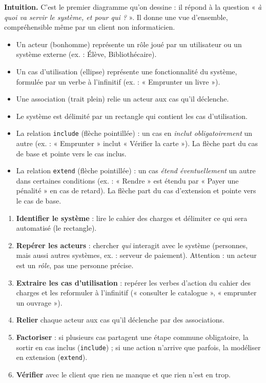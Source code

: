 \documentclass[11pt]{article}
\newcommand{\cle}[1]{{\popxbold\color{popdark}#1}}
\newcounter{popsec}
\newcounter{popsub}
\newcommand{\courssub}[1]{%
  \stepcounter{popsub}%
  \par\vspace{9pt}\noindent{\popxbold\fontsize{11.5}{13}\selectfont\color{popink}{\color{poporange}\thepopsec.\thepopsub}\hspace{6pt}#1}\par\nopagebreak\vspace{4pt}
}
\begin{document}
\courssub{Le diagramme de cas d'utilisation}

\textbf{Intuition.} C'est le premier diagramme qu'on dessine : il répond à la question « \emph{à quoi va servir le système, et pour qui ?} ». Il donne une vue d'ensemble, compréhensible même par un client non informaticien.

\begin{definition}
\begin{itemize}
\item Un \cle{acteur} (bonhomme) représente un rôle joué par un utilisateur ou un système externe (ex. : Élève, Bibliothécaire).
\item Un \cle{cas d'utilisation} (ellipse) représente une fonctionnalité du système, formulée par un verbe à l'infinitif (ex. : « Emprunter un livre »).
\item Une \cle{association} (trait plein) relie un acteur aux cas qu'il déclenche.
\item Le \cle{système} est délimité par un rectangle qui contient les cas d'utilisation.
\item La relation \texttt{include} (flèche pointillée) : un cas en \emph{inclut obligatoirement} un autre (ex. : « Emprunter » inclut « Vérifier la carte »). La flèche part du cas de base et pointe vers le cas inclus.
\item La relation \texttt{extend} (flèche pointillée) : un cas \emph{étend éventuellement} un autre dans certaines conditions (ex. : « Rendre » est étendu par « Payer une pénalité » en cas de retard). La flèche part du cas d'extension et pointe vers le cas de base.
\end{itemize}
\end{definition}

\begin{methode}
\begin{enumerate}
\item \textbf{Identifier le système} : lire le cahier des charges et délimiter ce qui sera automatisé (le rectangle).
\item \textbf{Repérer les acteurs} : chercher \emph{qui} interagit avec le système (personnes, mais aussi autres systèmes, ex. : serveur de paiement). Attention : un acteur est un \emph{rôle}, pas une personne précise.
\item \textbf{Extraire les cas d'utilisation} : repérer les verbes d'action du cahier des charges et les reformuler à l'infinitif (« consulter le catalogue », « emprunter un ouvrage »).
\item \textbf{Relier} chaque acteur aux cas qu'il déclenche par des associations.
\item \textbf{Factoriser} : si plusieurs cas partagent une étape commune obligatoire, la sortir en cas inclus (\texttt{include}) ; si une action n'arrive que parfois, la modéliser en extension (\texttt{extend}).
\item \textbf{Vérifier} avec le client que rien ne manque et que rien n'est en trop.
\end{enumerate}
\end{methode}
\end{document}
